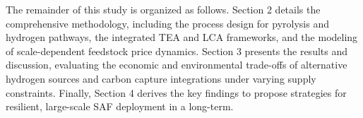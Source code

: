 The remainder of this study is organized as follows. Section 2 details the comprehensive methodology, including the process design for pyrolysis and hydrogen pathways, the integrated TEA and LCA frameworks, and the modeling of scale-dependent feedstock price dynamics. Section 3 presents the results and discussion, evaluating the economic and environmental trade-offs of alternative hydrogen sources and carbon capture integrations under varying supply constraints. Finally, Section 4 derives the key findings to propose strategies for resilient, large-scale SAF deployment in a long-term. 

